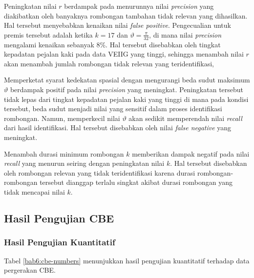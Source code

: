 Peningkatan nilai $r$ berdampak pada menurunnya nilai \textit{precision} yang diakibatkan oleh banyaknya rombongan tambahan tidak relevan yang dihasilkan. Hal tersebut menyebabkan kenaikan nilai \textit{false positive}. Pengecualian untuk premis tersebut adalah ketika $k = 17$ dan $\vartheta = \frac{\pi}{32}$, di mana nilai \textit{precision} mengalami kenaikan sebanyak 8\%. Hal tersebut disebabkan oleh tingkat kepadatan pejalan kaki pada data VEIIG yang tinggi, sehingga menambah nilai $r$ akan menambah jumlah rombongan tidak relevan yang teridentifikasi,

Memperketat syarat kedekatan spasial dengan mengurangi beda sudut maksimum $\vartheta$ berdampak positif pada nilai \textit{precision} yang meningkat. Peningkatan tersebut tidak lepas dari tingkat kepadatan pejalan kaki yang tinggi di mana pada kondisi tersebut, beda sudut menjadi nilai yang sensitif dalam proses identifikasi rombongan. Namun, memperkecil nilai $\vartheta$ akan sedikit memperendah nilai \textit{recall} dari hasil identifikasi. Hal tersebut disebabkan oleh nilai \textit{false negative} yang meningkat.

Menambah durasi minimum rombongan $k$ memberikan dampak negatif pada nilai \textit{recall} yang menurun seiring dengan peningkatan nilai $k$. Hal tersebut disebabkan oleh rombongan relevan yang tidak teridentifikasi karena durasi rombongan-rombongan tersebut dianggap terlalu singkat akibat durasi rombongan yang tidak mencapai nilai $k$.  

\subsection{Hasil Pengujian CBE}
\label{subsec:cbe-result}

\subsubsection{Hasil Pengujian Kuantitatif}
\label{subsubsec:cbe-quantitative}

Tabel \ref{bab6:cbe-numbers} menunjukkan hasil pengujian kuantitatif terhadap data pergerakan CBE.

